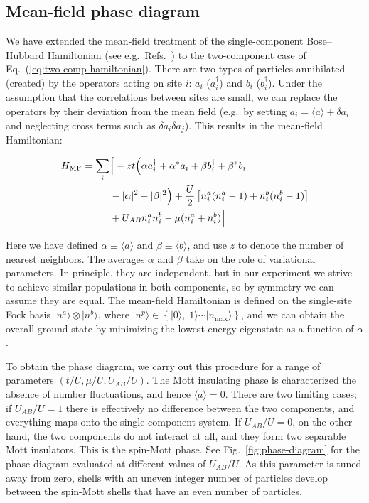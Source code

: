 \subsection*{Mean-field phase diagram}
We have extended the mean-field treatment of the single-component Bose--Hubbard Hamiltonian (see e.g.\ Refs.~\cite{Freericks94,Fisher89}) to the two-component case of Eq.~(\ref{eq:two-comp-hamiltonian}). There are two types of particles annihilated (created) by the operators acting on site $i$: $a_i$ ($a_i^\dagger$) and $b_i$ ($b_i^{\dagger}$). Under the assumption that the correlations between sites are small, we can replace the operators by their deviation from the mean field (e.g.\ by setting $a_i = \langle a \rangle + \delta a_i$ and neglecting cross terms such as $\delta a_i \delta a_j$). This results in the mean-field Hamiltonian:

\begin{align}
    H_\mathrm{MF} = \sum_i &\Big[ -zt \Big( \alpha a_i^\dagger + \alpha^* a_i + \beta b_i^\dagger + \beta^* b_i \notag \\
    &- |\alpha|^2 - |\beta|^2 \Big) + \frac{U}{2} \left[ n^a_i(n_i^a - 1) + n^b_i (n_i^b - 1) \right] \notag \\
    &+ U_{AB} n_i^a n_i^b - \mu (n_i^a + n_i^b) \Big]
\end{align}

Here we have defined $\alpha \equiv \langle a \rangle$ and $\beta \equiv \langle b \rangle$, and use $z$ to denote the number of nearest neighbors. The averages $\alpha$ and $\beta$ take on the role of variational parameters. In principle, they are independent, but in our experiment we strive to achieve similar populations in both components, so by symmetry we can assume they are equal. The mean-field Hamiltonian is defined on the single-site Fock basis $|n^a\rangle\otimes|n^b\rangle$, where $|n^p\rangle \in \left\{ |0\rangle, |1\rangle \cdots |n_\mathrm{max}\rangle \right\}$, and we can obtain the overall ground state by minimizing the lowest-energy eigenstate as a function of $\alpha$.

To obtain the phase diagram, we carry out this procedure for a range of parameters $\left(t/U, \mu/U, U_{AB}/U \right)$. The Mott insulating phase is characterized the absence of number fluctuations, and hence $\langle a \rangle = 0$.
There are two limiting cases; if $U_{AB}/U = 1$ there is effectively no difference between the two components, and everything maps onto the single-component system. If $U_{AB}/U = 0$, on the other hand, the two components do not interact at all, and they form two separable Mott insulators. This is the spin-Mott phase. See Fig.~\ref{fig:phase-diagram} for the phase diagram evaluated at different values of $U_{AB}/U$. As this parameter is tuned away from zero, shells with an uneven integer number of particles develop between the spin-Mott shells that have an even number of particles.